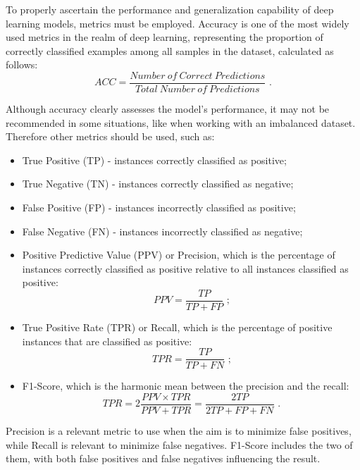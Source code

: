To properly ascertain the performance and generalization capability of deep learning models, metrics must be employed. Accuracy is one of the most widely used metrics in the realm of deep learning, representing the proportion of correctly classified examples among all samples in the dataset, calculated as follows: \begin{equation}ACC=\frac{Number\ of\ Correct\ Predictions}{Total\ Number\ of\ Predictions}\text{ .}\label{eq:acc}\end{equation}

Although accuracy clearly assesses the model's performance, it may not be recommended in some situations, like when working with an imbalanced dataset. Therefore other metrics should be used, such as:
\begin{itemize}
    \item True Positive (TP) - instances correctly classified as positive;
    \item True Negative (TN) - instances correctly classified as negative;
    \item False Positive (FP) - instances incorrectly classified as positive;
    \item False Negative (FN) - instances incorrectly classified as negative;
    \item Positive Predictive Value (PPV) or Precision, which is the percentage of instances correctly classified as positive relative to all instances classified as positive: \begin{equation}PPV=\frac{TP}{TP+FP}\text{ ;}\label{eq:ppv}\end{equation}
    \item True Positive Rate (TPR) or Recall, which is the percentage of positive instances that are classified as positive: \begin{equation}TPR=\frac{TP}{TP+FN}\text{ ;}\label{eq:tpr}\end{equation}
    \item F1-Score, which is the harmonic mean between the precision and the recall: \begin{equation}TPR=2\frac{PPV \times TPR}{PPV+TPR}=\frac{2TP}{2TP+FP+FN}\text{ .}\label{eq:f1-score}\end{equation}
\end{itemize}

Precision is a relevant metric to use when the aim is to minimize false positives, while Recall is relevant to minimize false negatives. F1-Score includes the two of them, with both false positives and false negatives influencing the result.

